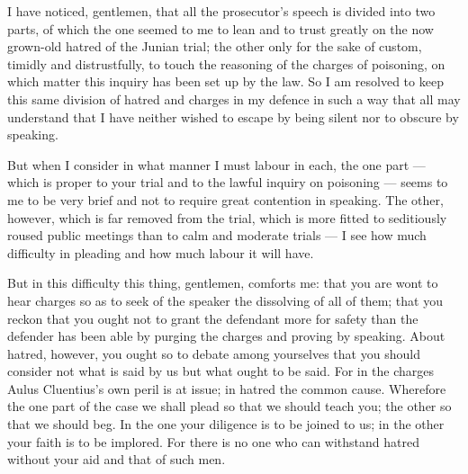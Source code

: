 %

 I have noticed, gentlemen, that all the prosecutor's speech is divided into two parts, of which the one seemed to me to lean and to trust greatly on the now grown-old hatred of the Junian trial; the other only for the sake of custom, timidly and distrustfully, to touch the reasoning of the charges of poisoning, on which matter this inquiry has been set up by the law. So I am resolved to keep this same division of hatred and charges in my defence in such a way that all may understand that I have neither wished to escape by being silent nor to obscure by speaking.

 But when I consider in what manner I must labour in each, the one part --- which is proper to your trial and to the lawful inquiry on poisoning --- seems to me to be very brief and not to require great contention in speaking. The other, however, which is far removed from the trial, which is more fitted to seditiously roused public meetings than to calm and moderate trials --- I see how much difficulty in pleading and how much labour it will have.

 But in this difficulty this thing, gentlemen, comforts me: that you are wont to hear charges so as to seek of the speaker the dissolving of all of them; that you reckon that you ought not to grant the defendant more for safety than the defender has been able by purging the charges and proving by speaking. About hatred, however, you ought so to debate among yourselves that you should consider not what is said by us but what ought to be said. For in the charges Aulus Cluentius's own peril is at issue; in hatred the common cause. Wherefore the one part of the case we shall plead so that we should teach you; the other so that we should beg. In the one your diligence is to be joined to us; in the other your faith is to be implored. For there is no one who can withstand hatred without your aid and that of such men.


